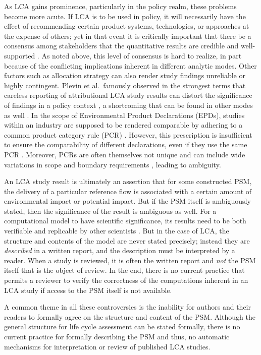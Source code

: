 As LCA gains prominence, particularly in the policy realm, these problems become more acute.  If LCA is to be used in policy, it will necessarily have the effect of recommending certain product systems, technologies, or approaches at the expense of others; yet in that event it is critically important that there be a consensus among stakeholders that the quantitative results are credible and well-supported \citep{Rainville_2015, McManus_2015}.  As noted above, this level of consensus is hard to realize, in part because of the conflicting implications inherent in different analytic modes.
Other factors such as allocation strategy \citep{Pelletier_2014} can also render study findings unreliable or highly contingent.  Plevin et al.\ famously observed in the strongest terms that careless reporting of attributional LCA study results can distort the significance of findings in a policy context \citep{Plevin_2013}, a shortcoming that can be found in other modes as well \citep{Brandao_2014}.  In the scope of Environmental Product Declarations (EPDs), studies within an industry are supposed to be rendered comparable by adhering to a common product category rule (PCR) \citep{Fet_2006}.  However, this prescription is insufficient to ensure the comparability of different declarations, even if they use the same PCR \citep{Modahl_2012}.  Moreover, PCRs are often themselves not unique and can include wide variations in scope and boundary requirements \citep{Subramanian_2012}, leading to ambiguity.  

An LCA study result is ultimately an assertion that for some constructed PSM, the delivery of a particular reference flow is associated with a certain amount of environmental impact or potential impact.  But if the PSM itself is ambiguously stated, then the significance of the result is ambiguous as well.  For a computational model to have scientific significance, its results need to be both verifiable and replicable by other scientists \citep{Fomel_2009, Mesirov_2010}.  But in the case of LCA, the structure and contents of the model are never stated precisely; instead they are \emph{described} in a written report, and the description must be interpreted by a reader.  When a study is reviewed, it is often the written report and \emph{not} the PSM itself that is the object of review.  In the end, there is no current practice that permits a reviewer to verify the correctness of the computations inherent in an LCA study if access to the PSM itself is not available.

A common theme in all these controversies is the inability for authors and their readers to formally agree on the structure and content of the PSM.  Although the general structure for life cycle assessment can be stated formally, there is no current practice for formally describing the PSM and thus, no automatic mechanisms for interpretation or review of published LCA studies.  

